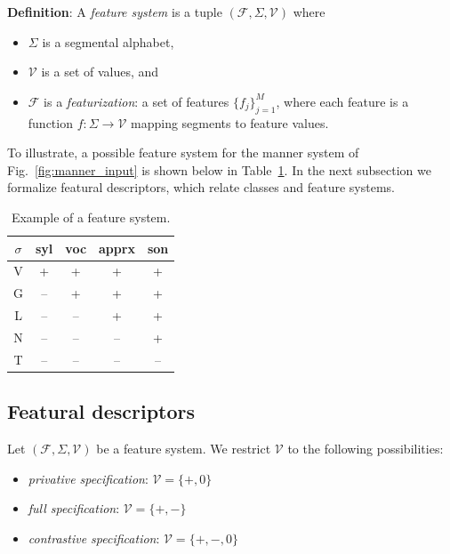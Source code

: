 \documentclass[11pt, oneside]{article}   	%
\begin{document}
\textbf{Definition}: A \textit{feature system} is a tuple $(\mathcal F, \Sigma, \mathcal V)$ where \begin{itemize}
    \item $\Sigma$ is a segmental alphabet, 
    \item $\mathcal V$ is a set of values, and 
    \item $\mathcal F$ is a \textit{featurization}: a set of features $\{f_j\}_{j=1}^M$, where each feature is a function $f: \Sigma \rightarrow \mathcal V$ mapping segments to feature values.
    \end{itemize}

\noindent To illustrate, a possible feature system for the manner system of Fig.~\ref{fig:manner_input} is shown below in Table~\ref{table:featurization}. In the next subsection we formalize featural descriptors, which relate classes and feature systems.

\begin{table}[h]
    \centering
    \begin{tabular} {|c||c|c|c|c|}
    \hline
        $\sigma$ & syl & voc & apprx & son \\ \hline
        V & + & + & + & + \\
        G & -- & + & + & + \\
        L & -- & -- & + & + \\
        N & -- & -- & -- & + \\
        T & -- & -- & -- & -- \\
        \hline
    \end{tabular}
    \caption{Example of a feature system.}
    \label{table:featurization}
\end{table}

\subsection{Featural descriptors}

Let $(\mathcal F, \Sigma, \mathcal V)$ be a feature system. We restrict $\mathcal V$ to the following possibilities: \begin{itemize}
    \item \textit{privative specification}: $\mathcal V = \{ +, 0 \}$
    \item \textit{full specification}: $\mathcal V = \{ +, - \}$
    \item \textit{contrastive specification}: $\mathcal V = \{ +, -, 0 \}$
    \end{itemize}
\end{document}
